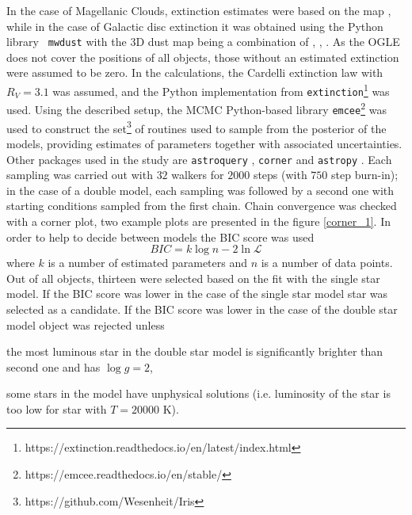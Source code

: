 \documentclass{pracalicmgr}
\newenvironment{itemize*}%
  {\vspace{-\topsep}
    \begin{itemize}%
    \setlength{\itemsep}{0pt}%
    \setlength{\parskip}{0pt}}%
  {\end{itemize}
  \vspace{-\topsep}}
\begin{document}
In the case of Magellanic Clouds, extinction estimates were based on the map \citet{skowron_ogle-ing_2021}, while in the case of Galactic disc extinction it
was obtained using the Python library \texttt{ mwdust} \citep{bovy_galactic_2016} with the 3D dust map being a combination of \citet{green_3d_2019}, \citet{greiner_unusually_2001},
\citet{drimmel_three-dimensional_2003}.
As the OGLE does not cover the positions of all objects, those without an estimated extinction were assumed to be zero.
In the calculations, the Cardelli extinction law \citep{cardelli_relationship_1989} with $R_V=3.1$ was assumed,
and the Python implementation from \texttt{extinction}\footnote{https://extinction.readthedocs.io/en/latest/index.html} was used.
Using the described setup, the MCMC Python-based library \texttt{emcee}\footnote{https://emcee.readthedocs.io/en/stable/} \citep{foreman-mackey_emcee_2013}
was used to construct the set\footnote{https://github.com/Wesenheit/Iris} of routines used to sample from the posterior of the models, providing estimates of parameters together
with associated uncertainties.
Other packages used in the study are \texttt{astroquery} \citep{ginsburg_astroquery_2019},
\texttt{corner} \citep{foreman-mackey_cornerpy_2016} and \texttt{astropy} \citep{astropy_collaboration_astropy_2022}.
Each sampling was carried out with $32$ walkers for $2000$ steps (with $750$ step burn-in); in the case of a double model, each sampling 
was followed by a second one with starting conditions sampled from the first chain. 
Chain convergence was checked with a corner plot, two example plots are presented in the figure
\ref{corner_1}.
In order to help to decide between models
the BIC score was used 
\begin{equation}
    BIC=k\log{n}-2\ln{\mathcal{L}}
\end{equation} where $k$ is a number of estimated parameters and $n$ is a number of data points. Out of all objects, thirteen were selected based on the
fit with the single star model.
If the BIC score was lower in the case of the single star model star was selected as a candidate.
If the BIC score was lower in the case of the double star model object was rejected unless
\begin{itemize*}
    \item the most luminous star in the double star model is significantly brighter than second one and has $\log g=2$,
    \item some stars in the model have unphysical solutions (i.e. luminosity of the star is too low for star with $T=20000$ K).
\end{itemize*}
\end{document}
